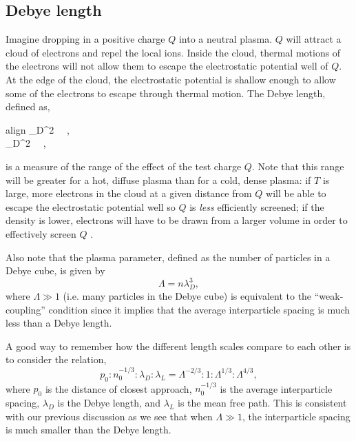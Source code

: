 	\subsection{Debye length}
	Imagine dropping in a positive charge $Q$ into a neutral plasma. $Q$ will attract a cloud of electrons and repel the local ions. Inside the cloud, thermal motions of the electrons will not allow them to escape the electrostatic potential well of $Q$. At the edge of the cloud, the electrostatic potential is shallow enough to allow some of the electrons to escape through thermal motion. The Debye length, defined as,
	\begin{empheq}[box=\widefbox]{align}
		\lambda_D^2 \equiv {}~~,\\
		\lambda_D^2 \equiv {}~~,
	\end{empheq}
	is a measure of the range of the effect of the test charge $Q$. Note that this range will be greater for a hot, diffuse plasma than for a cold, dense plasma: if $T$ is large, more electrons in the cloud at a given distance from $Q$ will be able to escape the electrostatic potential well so $Q$ is \textit{less} efficiently screened; if the density is lower, electrons will have to be drawn from a larger volume in order to effectively screen $Q$ \citep{dendy_plasma_1990}.

	Also note that the plasma parameter, defined as the number of particles in a Debye cube, is given by
	\begin{equation}
		\Lambda = n\lambda_D^3,
	\end{equation}		
	where $\Lambda\gg1$ (i.e. many particles in the Debye cube) is equivalent to the ``weak-coupling'' condition since it implies that the average interparticle spacing is much less than a Debye length.

	A good way to remember how the different length scales compare to each other is to consider the relation,
	\begin{equation}
		p_0:n_0^{-1/3}:\lambda_D:\lambda_L = \Lambda^{-2/3}:1:\Lambda^{1/3}:\Lambda^{4/3},
	\end{equation}
	where $p_0$ is the distance of closest approach, $n_0^{-1/3}$ is the average interparticle spacing, $\lambda_D$ is the Debye length, and $\lambda_L$ is the mean free path. This is consistent with our previous discussion as we see that when $\Lambda\gg1$, the interparticle spacing is much smaller than the Debye length.

